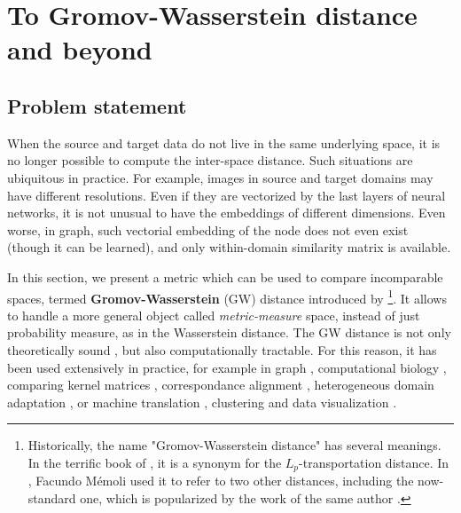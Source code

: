 \section{To Gromov-Wasserstein distance and beyond} \label{sec:gw}

\subsection{Problem statement}

When the source and target data do not live in the same underlying space, it is no longer possible
to compute the inter-space distance. Such situations are ubiquitous in practice.
For example, images in source and target domains may have different resolutions. Even if they
are vectorized by the last layers of neural networks, it is not unusual to have the
embeddings of different dimensions. Even worse, in graph,
such vectorial embedding of the node does not even exist (though it can be learned),
and only within-domain similarity matrix is available.

In this section, we present a metric which can be used to compare incomparable spaces,
termed \textbf{Gromov-Wasserstein} (GW) distance introduced by \citet{Memoli07,Memoli11}
\footnote{Historically, the name "Gromov-Wasserstein distance" has several meanings.
In the terrific book of \citet{Villani08}, it is a synonym
for the $L_p$-transportation distance. In \citep{Memoli11b},
Facundo Mémoli used it to refer to two other distances, including the now-standard one, which is
popularized by the work of the same author \citep{Memoli11}.}. It allows to handle a more general
object called \textit{metric-measure} space, instead of just probability measure, as in
the Wasserstein distance. The GW distance is not only theoretically sound \citep{Memoli11,Sturm12},
but also computationally tractable. For this reason, it has been used extensively in practice,
for example in graph \citep{Vayer19b,Xu19,Xu19b,Chowdhury20,Vincent21},
computational biology \citep{Demetci20}, comparing kernel matrices \citep{Peyre16},
correspondance alignment \citep{Solomon16}, heterogeneous domain adaptation \citep{Yan18},
or machine translation \citep{Melis18}, clustering and data visualization \citep{Ryner22}.

